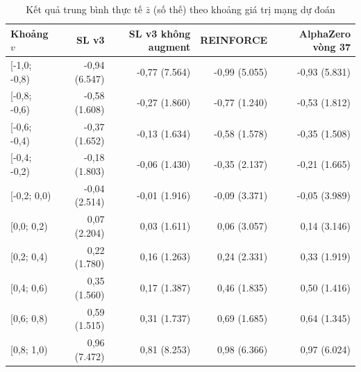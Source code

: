 \begin{table}[H]
  \centering
  \footnotesize
  \caption{Kết quả trung bình thực tế $\bar z$ (số thế) theo khoảng giá trị mạng dự đoán}
  \label{tab:cs-mang-calib}
  \begin{tabular}{lrrrr}
    \toprule
    Khoảng $v$ & SL v3 & SL v3 không augment & REINFORCE & AlphaZero vòng 37 \\
    \midrule
    {}[-1,0; -0,8) & -0,94 (6.547) & -0,77 (7.564) & -0,99 (5.055) & -0,93 (5.831) \\
    {}[-0,8; -0,6) & -0,58 (1.608) & -0,27 (1.860) & -0,77 (1.240) & -0,53 (1.812) \\
    {}[-0,6; -0,4) & -0,37 (1.652) & -0,13 (1.634) & -0,58 (1.578) & -0,35 (1.508) \\
    {}[-0,4; -0,2) & -0,18 (1.803) & -0,06 (1.430) & -0,35 (2.137) & -0,21 (1.665) \\
    {}[-0,2; 0,0) & -0,04 (2.514) & -0,01 (1.916) & -0,09 (3.371) & -0,05 (3.989) \\
    {}[0,0; 0,2) & 0,07 (2.204) & 0,03 (1.611) & 0,06 (3.057) & 0,14 (3.146) \\
    {}[0,2; 0,4) & 0,22 (1.780) & 0,16 (1.263) & 0,24 (2.331) & 0,33 (1.919) \\
    {}[0,4; 0,6) & 0,35 (1.560) & 0,17 (1.387) & 0,46 (1.835) & 0,50 (1.416) \\
    {}[0,6; 0,8) & 0,59 (1.515) & 0,31 (1.737) & 0,69 (1.685) & 0,64 (1.345) \\
    {}[0,8; 1,0) & 0,96 (7.472) & 0,81 (8.253) & 0,98 (6.366) & 0,97 (6.024) \\
    \bottomrule
  \end{tabular}
\end{table}
